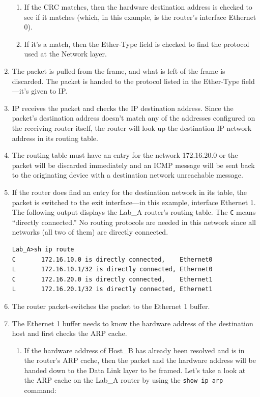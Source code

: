 \begin{enumerate}
  \begin{enumerate}
  \tightlist
  \item
    If the CRC matches, then the hardware destination address is checked
    to see if it matches (which, in this example, is the router's
    interface Ethernet 0).
  \item
    If it's a match, then the Ether-Type field is checked to find the
    protocol used at the Network layer.
  \end{enumerate}
\item
  The packet is pulled from the frame, and what is left of the frame is
  discarded. The packet is handed to the protocol listed in the
  Ether-Type field---it's given to IP.
\item
  IP receives the packet and checks the IP destination address. Since
  the packet's destination address doesn't match any of the addresses
  configured on the receiving router itself, the router will look up the
  destination IP network address in its routing table.
\item
  The routing table must have an entry for the network 172.16.20.0 or
  the packet will be discarded immediately and an ICMP message will be
  sent back to the originating device with a destination network
  unreachable message.
\item
  If the router does find an entry for the destination network in its
  table, the packet is switched to the exit interface---in this example,
  interface Ethernet 1. The following output displays the Lab\_A
  router's routing table. The \texttt{C} means ``directly connected.''
  No routing protocols are needed in this network since all networks
  (all two of them) are directly connected.

\begin{verbatim}
Lab_A>sh ip route
C       172.16.10.0 is directly connected,    Ethernet0
L       172.16.10.1/32 is directly connected, Ethernet0
C       172.16.20.0 is directly connected,    Ethernet1
L       172.16.20.1/32 is directly connected, Ethernet1
\end{verbatim}
\item
  \protect\hypertarget{c09.xhtmlux5cux23Page_364}{}{}The router
  packet-switches the packet to the Ethernet 1 buffer.
\item
  The Ethernet 1 buffer needs to know the hardware address of the
  destination host and first checks the ARP cache.

  \begin{enumerate}
  \item
    If the hardware address of Host\_B has already been resolved and is
    in the router's ARP cache, then the packet and the hardware address
    will be handed down to the Data Link layer to be framed. Let's take
    a look at the ARP cache on the Lab\_A router by using the
    \texttt{show\ ip\ arp} command:


\end{enumerate}
\end{enumerate}
